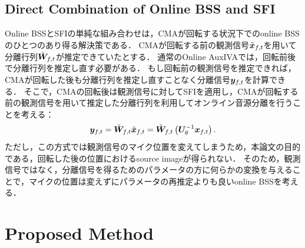 \documentclass[sip,biber]{now-journal}
\begin{document}
\subsection{Direct Combination of Online BSS and SFI}

Online BSSとSFIの単純な組み合わせは，CMAが回転する状況下でのonline BSSのひとつのあり得る解決策である．
CMAが回転する前の観測信号$\refpos{\Obs} _{\ft}$を用いて分離行列$\refpos{\Demix} _{\ft}$が推定できていたとする．
通常のOnline AuxIVAでは，回転前後で分離行列を推定し直す必要がある．
もし回転前の観測信号を推定できれば，CMAが回転した後も分離行列を推定し直すことなく分離信号$\Est _{\ft}$を計算できる．
そこで，CMAの回転後は観測信号に対してSFIを適用し，CMAが回転する前の観測信号を用いて推定した分離行列を利用してオンライン音源分離を行うことを考える：
\begin{equation}
  \Est _{\ft} = \refpos{\Demix} _{\ft} \refpos{\Obs} _{\ft} = \refpos{\Demix} _{\ft} \left(\rotMat _{\rotSpat} ^{-1} \Obs _{\ft}\right).
\end{equation}
ただし，この方式では観測信号のマイク位置を変えてしまうため，本論文の目的である，回転した後の位置におけるsource imageが得られない．
そのため，観測信号ではなく，分離信号を得るためのパラメータの方に何らかの変換を与えることで，マイクの位置は変えずにパラメータの再推定よりも良いonline BSSを考える．

\section{Proposed Method}\label{sec:proposed}
\end{document}
